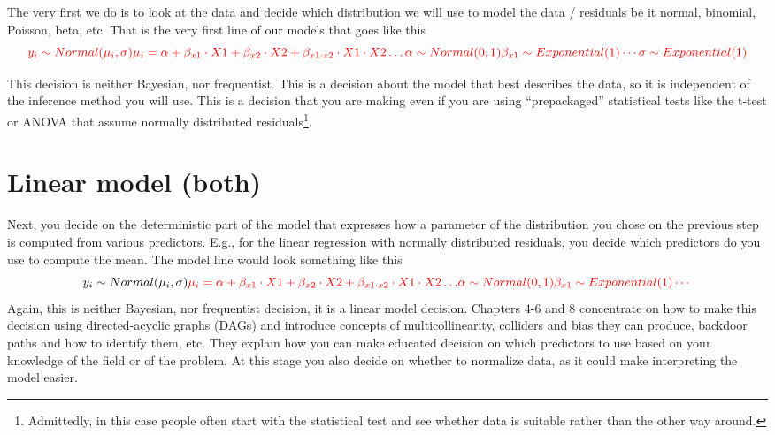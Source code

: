 \documentclass[
]{book}
\begin{document}
The very first we do is to look at the data and decide which distribution we will use to model the data / residuals be it normal, binomial, Poisson, beta, etc. That is the very first line of our models that goes like this
\[
\color{red}{y_i \sim Normal(\mu_i, \sigma)} \\
\mu_i = \alpha + \beta_{x1} \cdot X1 + \beta_{x2} \cdot X2 + \beta_{x1\cdot x2} \cdot X1 \cdot X2 \dotso \\
\alpha \sim Normal(0, 1) \\
\beta_{x1} \sim Exponential(1) \\
\cdots \\
\sigma \sim Exponential(1)
\]

This decision is neither Bayesian, nor frequentist. This is a decision about the model that best describes the data, so it is independent of the inference method you will use. This is a decision that you are making even if you are using ``prepackaged'' statistical tests like the t-test or ANOVA that assume normally distributed residuals\footnote{Admittedly, in this case people often start with the statistical test and see whether data is suitable rather than the other way around.}.

\hypertarget{linear-model-both}{%
\section{Linear model (both)}\label{linear-model-both}}

Next, you decide on the deterministic part of the model that expresses how a parameter of the distribution you chose on the previous step is computed from various predictors. E.g., for the linear regression with normally distributed residuals, you decide which predictors do you use to compute the mean. The model line would look something like this
\[
y_i \sim Normal(\mu_i, \sigma) \\
\color{red}{\mu_i = \alpha + \beta_{x1} \cdot X1 + \beta_{x2} \cdot X2 + \beta_{x1\cdot x2} \cdot X1 \cdot X2 \dotso} \\
\alpha \sim Normal(0, 1) \\
\beta_{x1} \sim Exponential(1) \\
\cdots
\]
Again, this is neither Bayesian, nor frequentist decision, it is a linear model decision. Chapters 4-6 and 8 concentrate on how to make this decision using directed-acyclic graphs (DAGs) and introduce concepts of multicollinearity, colliders and bias they can produce, backdoor paths and how to identify them, etc. They explain how you can make educated decision on which predictors to use based on your knowledge of the field or of the problem. At this stage you also decide on whether to normalize data, as it could make interpreting the model easier.
\end{document}

